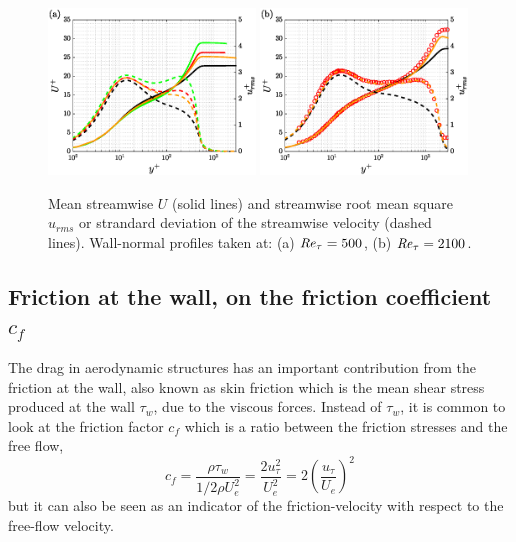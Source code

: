 \begin{figure}
    \centering
    \includegraphics[width=0.49\textwidth]{imgs/stats/U_uu_a.eps}
    \includegraphics[width=0.49\textwidth]{imgs/stats/U_uu_b.eps}
    \caption{Mean streamwise $U$ (solid lines) and streamwise root mean square $u_{rms}$ or strandard deviation of the streamwise velocity (dashed lines). Wall-normal profiles taken at: (a) $\mbox{\textit{Re}}_{\tau}=500$, (b) $\mbox{\textit{Re}}_{\tau}=2100$. }
    \label{fig:U_uu_cap2}
\end{figure}

\subsection{Friction at the wall, on the friction coefficient $c_f$}

The drag in aerodynamic structures has an important contribution from the friction at the wall, also known as skin friction which is the mean shear stress produced at the wall $\tau_w$, due to the viscous forces.
Instead of $\tau_w$, it is common to look at the friction factor $c_f$ which is a ratio between the friction stresses and the free flow,
\begin{equation}
    c_f = \frac{\rho \tau_w}{1/2 \rho U_e^2} = \frac{2 u_{\tau}^2}{U_e^2} = 2\left( \frac{u_{\tau}}{U_e} \right)^2
\end{equation}
but it can also be seen as an indicator of the friction-velocity with respect to the free-flow velocity.

